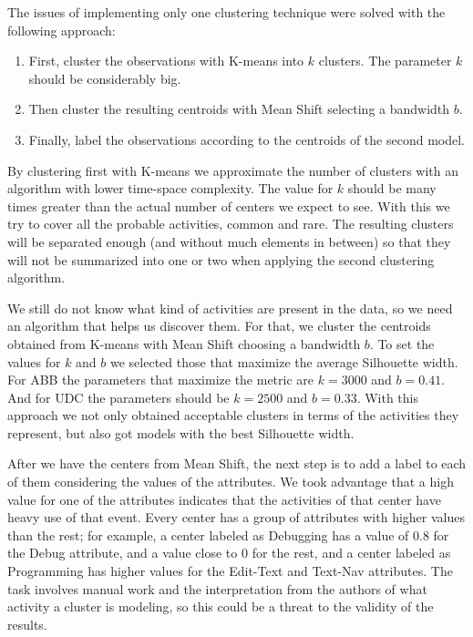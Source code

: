 The issues of implementing only one clustering technique were solved with the following approach:

\begin{enumerate}
	\item First, cluster the observations with K-means into $k$ clusters. The parameter $k$ should be considerably big.
	\item Then cluster the resulting centroids with Mean Shift selecting a bandwidth $b$.
	\item Finally, label the observations according to the centroids of the second model.
\end{enumerate}

By clustering first with K-means we approximate the number of clusters with an algorithm with lower time-space complexity. The value for $k$ should be many times greater than the actual number of centers we expect to see. With this we try to cover all the probable activities, common and rare. The resulting clusters will be separated enough (and without much elements in between) so that they will not be summarized into one or two when applying the second clustering algorithm.

We still do not know what kind of activities are present in the data, so we need an algorithm that helps us discover them. For that, we cluster the centroids obtained from K-means with Mean Shift choosing a bandwidth $b$. To set the values for $k$ and $b$ we selected those that maximize the average Silhouette width. For ABB the parameters that maximize the metric are $k=3000$ and $b=0.41$. And for UDC the parameters should be $k=2500$ and $b=0.33$. With this approach we not only obtained acceptable clusters in terms of the activities they represent, but also got models with the best Silhouette width.

After we have the centers from Mean Shift, the next step is to add a label to each of them considering the values of the attributes. We took advantage that a high value for one of the attributes indicates that the activities of that center have heavy use of that event. Every center has a group of attributes with higher values than the rest; for example, a center labeled as Debugging has a value of 0.8 for the Debug attribute, and a value close to 0 for the rest, and a center labeled as Programming has higher values for the Edit-Text and Text-Nav attributes. The task involves manual work and the interpretation from the authors of what activity a cluster is modeling, so this could be a threat to the validity of the results. 


